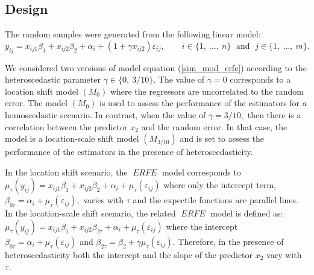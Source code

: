 \documentclass[15pt,a4paper]{article}
\DeclareMathOperator{\ERFE}{\textit{ERFE}}
\begin{document}
\subsection{Design}

The random samples were generated from the following linear model:
\begin{equation}\label{sim_mod_erfe}
    y_{ij} = x_{ij1}\beta_1 + x_{ij2}\beta_2 + \alpha_i + (1 + \gamma x_{ij2})\varepsilon_{ij}, \qquad i\in\lbrace 1,\ \ldots, \ n \rbrace \; \mbox{ and } \; j\in\lbrace 1,\ \ldots, \ m \rbrace. 
\end{equation}

We considered two versions of model equation (\ref{sim_mod_erfe}) according to the heteroscedastic parameter \(\gamma\in\lbrace 0, \ 3/10 \rbrace.\)
The value of \(\gamma=0\) corresponds to a location shift model \((M_0)\) where the regressors are uncorrelated to the random error. The model \((M_0)\) is used to assess the performance of the estimators for a homoscedastic scenario. In contrast, when the value of \(\gamma = 3/10,\) then there is a correlation between the predictor $x_{2}$ and the random error. In that case, the model is a location-scale shift model \((M_{3/10})\) and is set to assess the performance of the estimators in the presence of heteroscedasticity.

In the location shift scenario, the $\ERFE$ model corresponds to \(\mu_{\tau}(y_{ij})=x_{ij1}\beta_1 + x_{ij2}\beta_2 + \alpha_i + \mu_{\tau}(\varepsilon_{ij})\) where only the intercept term, \(\beta_{0\tau}=\alpha_i +\mu_{\tau}(\varepsilon_{ij}),\) varies with \(\tau\) and the expectile functions are parallel lines. In the location-scale shift scenario, the related $\ERFE$ model is defined as: \(\mu_{\tau}(y_{ij})= x_{ij1}\beta_1 + x_{ij2}\beta_{2\tau} + \alpha_i + \mu_{\tau}(\varepsilon_{ij})\) where the intercept $\beta_{0\tau}= \alpha_i + \mu_{\tau}(\varepsilon_{ij})$ and $\beta_{2\tau}= \beta_{2} + \gamma\mu_{\tau}(\varepsilon_{ij}).$ 
Therefore, in the presence of heteroscedasticity both the intercept and the slope of the predictor $x_2$ vary with \(\tau.\)
\end{document}
